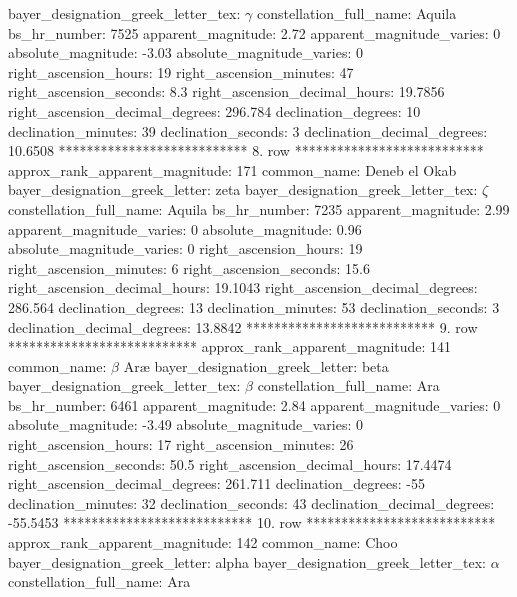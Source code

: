 bayer_designation_greek_letter_tex: $\gamma$
           constellation_full_name: Aquila
                      bs_hr_number: 7525
                apparent_magnitude: 2.72
         apparent_magnitude_varies: 0
                absolute_magnitude: -3.03
         absolute_magnitude_varies: 0
             right_ascension_hours: 19
           right_ascension_minutes: 47
           right_ascension_seconds: 8.3
     right_ascension_decimal_hours: 19.7856
   right_ascension_decimal_degrees: 296.784
               declination_degrees: 10
               declination_minutes: 39
               declination_seconds: 3
       declination_decimal_degrees: 10.6508
*************************** 8. row ***************************
    approx_rank_apparent_magnitude: 171
                       common_name: Deneb el Okab
    bayer_designation_greek_letter: zeta
bayer_designation_greek_letter_tex: $\zeta$
           constellation_full_name: Aquila
                      bs_hr_number: 7235
                apparent_magnitude: 2.99
         apparent_magnitude_varies: 0
                absolute_magnitude: 0.96
         absolute_magnitude_varies: 0
             right_ascension_hours: 19
           right_ascension_minutes: 6
           right_ascension_seconds: 15.6
     right_ascension_decimal_hours: 19.1043
   right_ascension_decimal_degrees: 286.564
               declination_degrees: 13
               declination_minutes: 53
               declination_seconds: 3
       declination_decimal_degrees: 13.8842
*************************** 9. row ***************************
    approx_rank_apparent_magnitude: 141
                       common_name: $\beta$ Ar{\ae}
    bayer_designation_greek_letter: beta
bayer_designation_greek_letter_tex: $\beta$
           constellation_full_name: Ara
                      bs_hr_number: 6461
                apparent_magnitude: 2.84
         apparent_magnitude_varies: 0
                absolute_magnitude: -3.49
         absolute_magnitude_varies: 0
             right_ascension_hours: 17
           right_ascension_minutes: 26
           right_ascension_seconds: 50.5
     right_ascension_decimal_hours: 17.4474
   right_ascension_decimal_degrees: 261.711
               declination_degrees: -55
               declination_minutes: 32
               declination_seconds: 43
       declination_decimal_degrees: -55.5453
*************************** 10. row ***************************
    approx_rank_apparent_magnitude: 142
                       common_name: Choo
    bayer_designation_greek_letter: alpha
bayer_designation_greek_letter_tex: $\alpha$
           constellation_full_name: Ara
